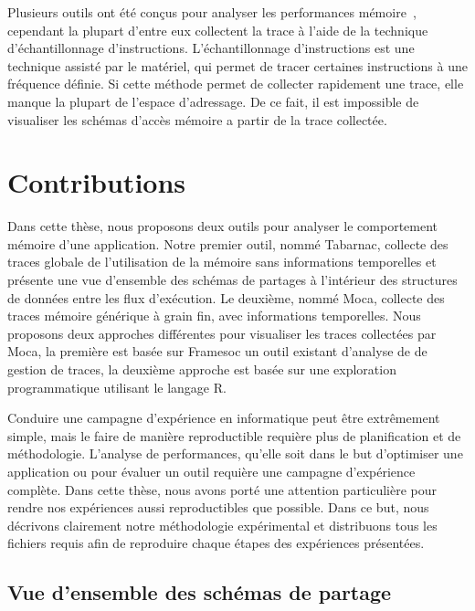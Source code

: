 Plusieurs outils ont été conçus pour analyser les performances mémoire~\cite{Lachaize12MemProf,Liu14Tool,Gimenez14Dissecting}, cependant la plupart d'entre eux collectent la trace à l'aide de la technique d'échantillonnage d'instructions.
L'échantillonnage d'instructions est une technique assisté par le matériel, qui permet de tracer certaines instructions à une fréquence\cite{Drongowski07Instructionbased,Levinthal09Performance} définie.
Si cette méthode permet de collecter rapidement une trace, elle manque la plupart de l'espace d'adressage.
De ce fait, il est impossible de visualiser les schémas d'accès mémoire a partir de la trace collectée.

\section*{Contributions}

Dans cette thèse, nous proposons deux outils pour analyser le comportement mémoire d'une application.
Notre premier outil, nommé \acrfull{Tabarnac}, collecte des traces globale de l'utilisation de la mémoire sans informations temporelles et présente une vue d'ensemble des schémas de partages à l'intérieur des structures de données entre les flux d'exécution.
Le deuxième, nommé \acrfull{Moca}, collecte des traces mémoire générique à grain fin, avec informations temporelles.
Nous proposons deux approches différentes pour visualiser les traces collectées par \gls{Moca}, la première est basée sur \gls{Framesoc} un outil existant d'analyse de de gestion de traces, la deuxième approche est basée sur une exploration programmatique utilisant le langage R.

Conduire une campagne d'expérience en informatique peut être extrêmement simple, mais le faire de manière reproductible requière plus de planification et de méthodologie.
L'analyse de performances, qu'elle soit dans le but d'optimiser une application ou pour évaluer un outil requière une campagne d'expérience complète.
Dans cette thèse, nous avons porté une attention particulière pour rendre nos expériences aussi reproductibles que possible.
Dans ce but, nous décrivons clairement notre méthodologie expérimental et distribuons tous les fichiers requis afin de reproduire chaque étapes des expériences présentées.

\subsection*{Vue d'ensemble des schémas de partage}

